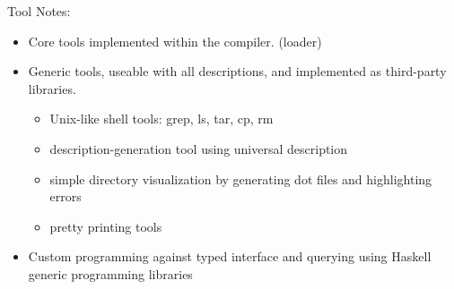Tool Notes:

\begin{itemize}
\item Core tools implemented within the compiler. (loader)
\item Generic tools, useable with all descriptions, and implemented as
  third-party libraries.
\begin{itemize}
\item Unix-like shell tools: grep, ls, tar, cp, rm
\item description-generation tool using universal description
\item simple directory visualization by generating dot files and highlighting errors
\item pretty printing tools
\end{itemize}
\item Custom programming against typed interface and querying using Haskell generic programming libraries
\end{itemize}
